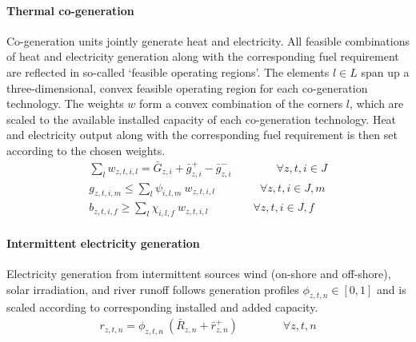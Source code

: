 \documentclass[11pt,a4paper]{article}
\begin{document}
\paragraph{Thermal co-generation}
Co-generation units jointly generate heat and electricity. All feasible combinations of heat and electricity generation along with the corresponding fuel requirement are reflected in so-called `feasible operating regions'. 
The elements $l \in L$ span up a three-dimensional, convex feasible operating region for each co-generation technology. 
The weights $w$ form a convex combination of the corners $l$, which are scaled to the available installed capacity of each co-generation technology.
Heat and electricity output along with the corresponding fuel requirement is then set according to the chosen weights.
\begin{align}
\sum_{l} w_{z,t,i,l} = \bar{G}_{z,i} + \bar{g}^{+}_{z,i} - \bar{g}^{-}_{z,i} \qquad \qquad \forall z,t,i \in J \\
g_{z,t,i,m} \leq \sum_{l} \psi_{i,l,m} \: w_{z,t,i,l} \qquad \qquad \forall z,t,i \in J, m \\
b_{z,t,i,f} \geq \sum_{l} \chi_{i,l,f} \: w_{z,t,i,l} \qquad \qquad \forall z,t,i \in J, f
\end{align}

\paragraph{Intermittent electricity generation}
Electricity generation from intermittent sources wind (on-shore and off-shore), solar irradiation, and river runoff follows generation profiles $\phi_{z,t,n} \in [0,1]$ and is scaled according to corresponding installed and added capacity.
\begin{align}
r_{z,t,n} = \phi_{z,t,n} \: \left( \bar{R}_{z,n} + \bar{r}^{+}_{z,n} \right) \qquad \qquad \forall z,t,n
\end{align}
\end{document}
